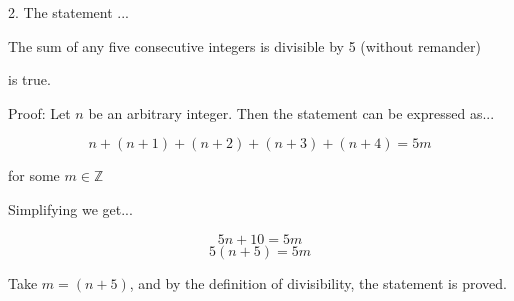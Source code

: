 \documentclass[12pt]{article}
\begin{document}
2. The statement ...\newline

The sum of any five consecutive integers is divisible by 5 (without remander)\newline

is true.\newline

Proof: Let $n$ be an arbitrary integer. Then the statement can be expressed as...

$$n + (n+1) + (n+2) + (n+3) + (n+4) = 5m$$

for some $m \in \mathbb{Z}$\newline

Simplifying we get...

$$5n + 10 = 5m$$
$$5(n+5) = 5m$$\newline

Take $m = (n+5)$, and by the definition of divisibility, the statement is proved.
\end{document}
